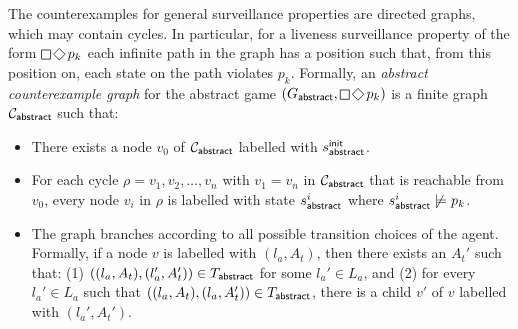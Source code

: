 The counterexamples for general surveillance properties are directed graphs, which may contain cycles. In particular, for a liveness surveillance property of the form $\LTLglobally\LTLfinally p_k$ each infinite path in the graph has a position such that, from this position on, each state on the path violates $p_k$. Formally, an \emph{abstract counterexample graph} for the abstract game $(G_\abstr,\LTLglobally\LTLfinally p_k)$ is a finite graph $\mathcal{C}_{\mathsf{abstract}}$ such that:
\begin{itemize}
\item There exists a node $v_0$ of $\mathcal{C}_{\mathsf{abstract}}$ labelled with $s^{\mathsf{init}}_{\mathsf{abstract}}$.
\item For each cycle $\rho = v_1,v_2,\ldots,v_n$ with $v_1 = v_n$ in $\mathcal{C}_{\mathsf{abstract}}$ that is reachable from $v_0$, every node $v_i$ in $\rho$ is labelled with state $s_{\mathsf{abstract}}^i$ where $s_{\mathsf{abstract}}^i \not\models p_k$.
\item The graph branches according to all possible transition choices of the agent. Formally, if a node $v$ is labelled with $(l_a,A_t)$, then there exists an $A_t'$  such that: (1) $((l_a,A_t),(l_a',A_t')) \in T_{\mathsf{abstract}}$ for some $l_a' \in L_a$, and (2) for every $l_a' \in L_a$ such that $((l_a,A_t),(l_a,A_t')) \in T_{\mathsf{abstract}}$, there is a child $v'$ of $v$ labelled with $(l_a',A_t')$.
\end{itemize}   

